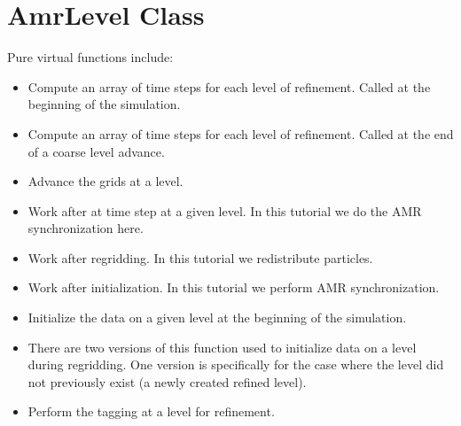\documentclass[letterpaper,10pt,english]{sphinxmanual}
\begin{document}
\section{AmrLevel Class}
\label{\detokenize{AmrLevel:amrlevel-class}}
\sphinxAtStartPar
Pure virtual functions include:
\begin{itemize}
\item {} 
\sphinxAtStartPar
{} Compute an array of time steps for each level of
refinement. Called at the beginning of the simulation.

\item {} 
\sphinxAtStartPar
{} Compute an array of time steps for each level of
refinement. Called at the end of a coarse level advance.

\item {} 
\sphinxAtStartPar
{} Advance the grids at a level.

\item {} 
\sphinxAtStartPar
{} Work after at time step at a given level. In this
tutorial we do the AMR synchronization here.

\item {} 
\sphinxAtStartPar
{} Work after regridding. In this tutorial we redistribute
particles.

\item {} 
\sphinxAtStartPar
{} Work after initialization. In this tutorial we perform
AMR synchronization.

\item {} 
\sphinxAtStartPar
{} Initialize the data on a given level at the beginning of
the simulation.

\item {} 
\sphinxAtStartPar
{} There are two versions of this function used to initialize
data on a level during regridding. One version is specifically for the
case where the level did not previously exist (a newly created refined
level).

\item {} 
\sphinxAtStartPar
{} Perform the tagging at a level for refinement.

\end{itemize}
\end{document}
